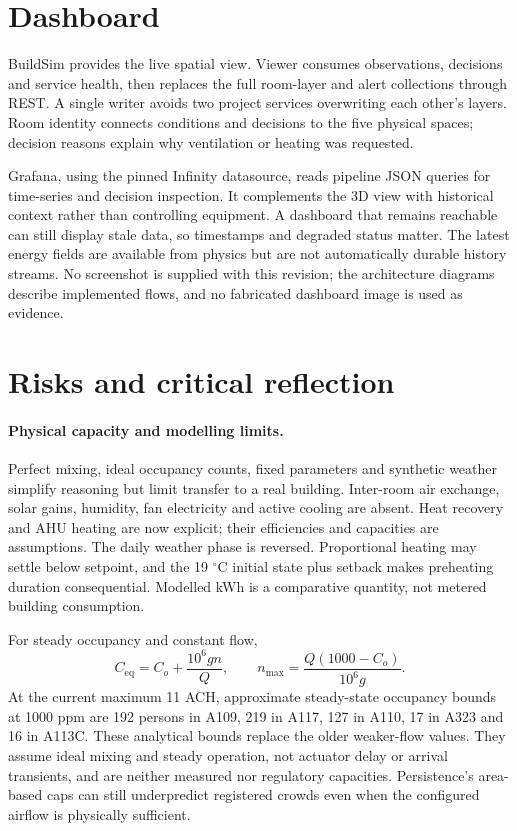 \documentclass[11pt,a4paper]{article}
\begin{document}
\section{Dashboard}
BuildSim provides the live spatial view. Viewer consumes observations, decisions and service health, then replaces the full room-layer and alert collections through REST. A single writer avoids two project services overwriting each other's layers. Room identity connects conditions and decisions to the five physical spaces; decision reasons explain why ventilation or heating was requested.

Grafana, using the pinned Infinity datasource, reads pipeline JSON queries for time-series and decision inspection. It complements the 3D view with historical context rather than controlling equipment. A dashboard that remains reachable can still display stale data, so timestamps and degraded status matter. The latest energy fields are available from physics but are not automatically durable history streams. No screenshot is supplied with this revision; the architecture diagrams describe implemented flows, and no fabricated dashboard image is used as evidence.

\section{Risks and critical reflection}
\paragraph{Physical capacity and modelling limits.}
Perfect mixing, ideal occupancy counts, fixed parameters and synthetic weather simplify reasoning but limit transfer to a real building. Inter-room air exchange, solar gains, humidity, fan electricity and active cooling are absent. Heat recovery and AHU heating are now explicit; their efficiencies and capacities are assumptions. The daily weather phase is reversed. Proportional heating may settle below setpoint, and the 19 $^\circ$C initial state plus setback makes preheating duration consequential. Modelled kWh is a comparative quantity, not metered building consumption.

For steady occupancy and constant flow,
\begin{equation}
C_{\mathrm{eq}}=C_o+\frac{10^6gn}{Q},\qquad
n_{\max}=\frac{Q(1000-C_o)}{10^6g}.
\end{equation}
At the current maximum 11 ACH, approximate steady-state occupancy bounds at 1000 ppm are 192 persons in A109, 219 in A117, 127 in A110, 17 in A323 and 16 in A113C. These analytical bounds replace the older weaker-flow values. They assume ideal mixing and steady operation, not actuator delay or arrival transients, and are neither measured nor regulatory capacities. Persistence's area-based caps can still underpredict registered crowds even when the configured airflow is physically sufficient.
\end{document}
